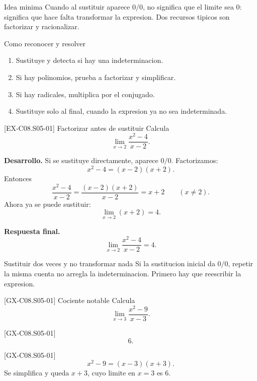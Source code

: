 \begin{theorybox}{Idea minima}
Cuando al sustituir aparece \(0/0\), no significa que el limite sea \(0\): significa que hace
falta transformar la expresion. Dos recursos tipicos son factorizar y racionalizar.
\end{theorybox}

\begin{methodbox}{Como reconocer y resolver}
\begin{enumerate}
  \item Sustituye y detecta si hay una indeterminacion.
  \item Si hay polinomios, prueba a factorizar y simplificar.
  \item Si hay radicales, multiplica por el conjugado.
  \item Sustituye solo al final, cuando la expresion ya no sea indeterminada.
\end{enumerate}
\end{methodbox}

\begin{solvedexample}{[EX-C08.S05-01] Factorizar antes de sustituir}
Calcula
\[
\lim_{x\to 2}\frac{x^2-4}{x-2}.
\]

\textbf{Desarrollo.} Si se sustituye directamente, aparece \(0/0\). Factorizamos:
\[
x^2-4=(x-2)(x+2).
\]
Entonces
\[
\frac{x^2-4}{x-2}=\frac{(x-2)(x+2)}{x-2}=x+2\qquad (x\neq 2).
\]
Ahora ya se puede sustituir:
\[
\lim_{x\to 2}(x+2)=4.
\]

\textbf{Respuesta final.}
\[
\lim_{x\to 2}\frac{x^2-4}{x-2}=4.
\]
\end{solvedexample}

\begin{commonerror}{Sustituir dos veces y no transformar nada}
Si la sustitucion inicial da \(0/0\), repetir la misma cuenta no arregla la indeterminacion.
Primero hay que reescribir la expresion.
\end{commonerror}

\begin{guidedexercise}{[GX-C08.S05-01] Cociente notable}
Calcula
\[
\lim_{x\to 3}\frac{x^2-9}{x-3}.
\]
\end{guidedexercise}

\begin{shortanswer}{[GX-C08.S05-01]}
\[
6.
\]
\end{shortanswer}

\begin{fullsolution}{[GX-C08.S05-01]}
\[
x^2-9=(x-3)(x+3).
\]
Se simplifica y queda \(x+3\), cuyo limite en \(x=3\) es \(6\).
\end{fullsolution}

